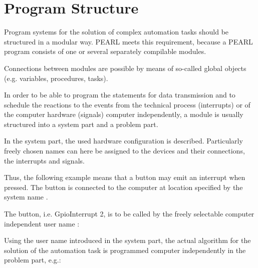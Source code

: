 \section{Program Structure}   %

Program systems for the solution of complex automation tasks should be
structured in a modular way. PEARL meets this requirement, because a
PEARL program consists of one or several separately compilable
modules.

Connections between modules are possible by means of so-called global
objects (e.g. variables, procedures, tasks).

In order to be able to program the statements for data transmission
and to schedule the reactions to the events from the technical process
(interrupts) or of the computer hardware (signals) computer
independently, a module is usually structured into a system part and a
problem part.

In the system part, the used hardware configuration is described.
Particularly freely chosen names can here be assigned to the devices and
their connections, the interrupts and signals. 

%


Thus, the following
example means that a button may emit an interrupt when pressed.
The button is connected to the computer at location specified
by the system name .

The button, i.e. GpioInterrupt 2, is to be called by the freely selectable
computer independent user name :


Using the user name introduced in the system part, the actual algorithm
for the solution of the automation task is programmed computer
independently in the problem part, e.g.:

 

